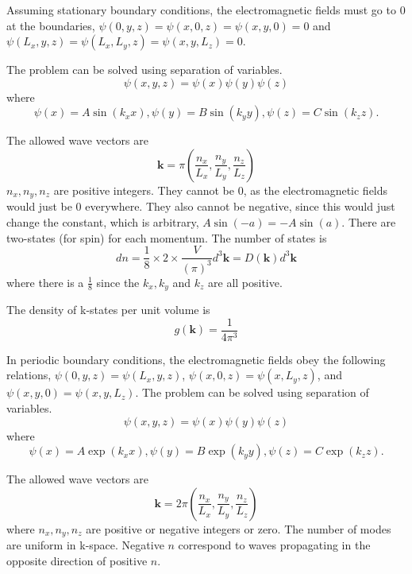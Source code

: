 \documentclass[12pt]{article}
\begin{document}
Assuming stationary boundary conditions, the electromagnetic fields must go to 0 at the boundaries,  $\psi(0, y, z) = \psi(x, 0, z) = \psi(x, y, 0) = 0$ and $\psi(L_x, y, z) = \psi(L_x, L_y, z) = \psi(x, y, L_z) = 0$.  

The problem can be solved using separation of variables.  
\begin{equation}
\psi(x, y, z) = \psi(x) \psi(y) \psi(z)
\end{equation}
where 
\begin{equation}
\psi(x) = A \sin (k_x x), \psi(y) = B \sin (k_y y), \psi(z) = C \sin (k_z z).
\end{equation}

The allowed wave vectors are 
\begin{equation}
\textbf{k} = \pi (\frac{n_x}{L_x}, \frac{n_y}{L_y}, \frac{n_z}{L_z})
\end{equation}
$n_x, n_y, n_z$ are positive integers.  They cannot be 0, as the electromagnetic fields would just be 0 everywhere.  They also cannot be negative, since this would just change the constant, which is arbitrary, 
$A \sin(-a) = -A \sin(a)$.  There are two-states (for spin) for each momentum.  The number of states is 
\begin{equation}
dn = \frac{1}{8} \times 2 \times \frac{V}{(\pi)^3}d^3\mathbf{k} = D(\mathbf{k})d^3\mathbf{k}
\end{equation}
where there is a $\frac{1}{8}$ since the $k_x, k_y$ and $k_z$ are all positive.  

The density of k-states per unit volume is 
\begin{equation}
\boxed{g(\mathbf{k}) = \frac{1}{4 \pi^3}} \label{eq:dos}
\end{equation}

In periodic boundary conditions, the electromagnetic fields obey the following relations, $\psi(0, y, z) = \psi(L_x, y, z)$, $\psi(x, 0, z) = \psi(x, L_y, z)$, and $\psi(x, y, 0) = \psi(x, y, L_z)$.
The problem can be solved using separation of variables.  
\begin{equation}
\psi(x, y, z) = \psi(x) \psi(y) \psi(z)
\end{equation}
where 
\begin{equation}
\psi(x) = A \exp (k_x x), \psi(y) = B \exp (k_y y), \psi(z) = C \exp (k_z z).
\end{equation}

The allowed wave vectors are 
\begin{equation}
\textbf{k} = 2 \pi (\frac{n_x}{L_x}, \frac{n_y}{L_y}, \frac{n_z}{L_z})
\end{equation}
where $n_x, n_y, n_z$ are positive or negative integers or zero.  The number of modes are uniform in k-space.  Negative $n$ correspond to waves propagating in the opposite direction of positive $n$.  
\end{document}
